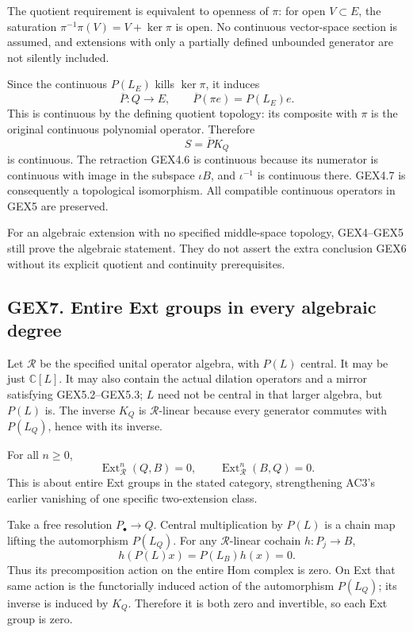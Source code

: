 The quotient requirement is equivalent to openness of \(\pi\): for open
\(V\subset E\), the saturation \(\pi^{-1}\pi(V)=V+\ker\pi\) is open. No
continuous vector-space section is assumed, and extensions with only a
partially defined unbounded generator are not silently included.

Since the continuous \(P(L_E)\) kills \(\ker\pi\), it induces \[
\overline P:Q\to E,\qquad \overline P(\pi e)=P(L_E)e.
\tag{GEX6.1}
\] This is continuous by the defining quotient topology: its composite
with \(\pi\) is the original continuous polynomial operator. Therefore
\[
S=\overline P K_Q
\tag{GEX6.2}
\] is continuous. The retraction GEX4.6 is continuous because its
numerator is continuous with image in the subspace \(\iota B\), and
\(\iota^{-1}\) is continuous there. GEX4.7 is consequently a topological
isomorphism. All compatible continuous operators in GEX5 are preserved.

For an algebraic extension with no specified middle-space topology,
GEX4--GEX5 still prove the algebraic statement. They do not assert the
extra conclusion GEX6 without its explicit quotient and continuity
prerequisites.

\subsection{GEX7. Entire Ext groups in every algebraic
degree}\label{gex7.-entire-ext-groups-in-every-algebraic-degree}

Let \(\mathscr R\) be the specified unital operator algebra, with
\(P(L)\) central. It may be just \(\mathbb C[L]\). It may also contain
the actual dilation operators and a mirror satisfying GEX5.2--GEX5.3;
\(L\) need not be central in that larger algebra, but \(P(L)\) is. The
inverse \(K_Q\) is \(\mathscr R\)-linear because every generator
commutes with \(P(L_Q)\), hence with its inverse.

For all \(n\ge0\), \[
\boxed{
\operatorname{Ext}_{\mathscr R}^n(Q,B)=0,\qquad
\operatorname{Ext}_{\mathscr R}^n(B,Q)=0.
}
\tag{GEX7.1}
\] This is about entire Ext groups in the stated category, strengthening
AC3's earlier vanishing of one specific two-extension class.

Take a free resolution \(P_\bullet\to Q\). Central multiplication by
\(P(L)\) is a chain map lifting the automorphism \(P(L_Q)\). For any
\(\mathscr R\)-linear cochain \(h:P_j\to B\), \[
h(P(L)x)=P(L_B)h(x)=0.
\tag{GEX7.2}
\] Thus its precomposition action on the entire Hom complex is zero. On
Ext that same action is the functorially induced action of the
automorphism \(P(L_Q)\); its inverse is induced by \(K_Q\). Therefore it
is both zero and invertible, so each Ext group is zero.

